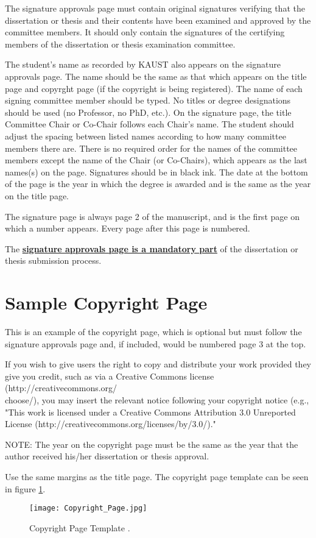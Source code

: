 The signature approvals page must contain original signatures verifying that the dissertation or thesis and their contents have been examined and approved by the committee members. It should only contain the signatures of the certifying members of the dissertation or thesis examination committee.

The student's name as recorded by KAUST also appears on the signature approvals page. The name should be the same as that which appears on the title page and copyrght page (if the copyright is being registered). The name of each signing committee member should be typed. No titles or degree designations should be used (no Professor, no PhD, etc.). On the signature page, the title Committee Chair or Co-Chair follows each Chair's name. The student should adjust the spacing between listed names according to how many committee members there are.  There is no required order for the names of the committee members except the name of the Chair (or Co-Chairs), which appears as the last names(s) on the page. Signatures should be in black ink. The date at the bottom of the page is the year in which the degree is awarded and is the same as the year on the title page.

The signature page is always page 2 of the manuscript, and is the first page on which a number appears. Every page after this page is numbered.

The \underline{\textbf{signature approvals page is a mandatory part}} of the dissertation or thesis submission process.

\section{Sample Copyright Page}

This is an example of the copyright page, which is optional but must follow the signature approvals page and, if included, would be numbered page 3 at the top.  

If you wish to give users the right to copy and distribute your work provided they give you credit, such as via a Creative Commons license (http://creativecommons.org/\\choose/), you may insert the relevant notice following your copyright notice (e.g., "This work is licensed under a Creative Commons Attribution 3.0 Unreported License (http://creativecommons.org/licenses/by/3.0/)."

NOTE: The year on the copyright page must be the same as the year that the author received his/her dissertation or thesis approval.

Use the same margins as the title page. The copyright page template can be seen in figure \ref{copyright_page}.

\begin{figure}[H]
\begin{center}
\texttt{[image: Copyright\_Page.jpg]}
\caption{Copyright Page Template \cite{guidelines}.}
\label{copyright_page}
\end{center}
\end{figure}

